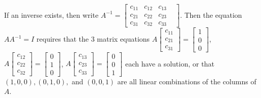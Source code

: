 \documentclass[10pt]{article}
\begin{document}
If an inverse exists, then write $A^{-1} = \begin{bmatrix}
c_{11}&c_{12}&c_{13}&\\ 
c_{21}&c_{22}&c_{23}&\\ 
c_{31}&c_{32}&c_{33}& 
\end{bmatrix} $. Then the equation $AA^{-1}=I$ requires that the 3 matrix equations
$A\begin{bmatrix} c_{11}\\ c_{21}\\c_{31}\end{bmatrix} = \begin{bmatrix} 1\\0\\0\end{bmatrix}$,
$A\begin{bmatrix} c_{12}\\ c_{22}\\c_{32}\end{bmatrix} = \begin{bmatrix} 0\\1\\0\end{bmatrix}$,
$A\begin{bmatrix} c_{13}\\ c_{23}\\c_{33}\end{bmatrix} = \begin{bmatrix} 0\\ 0\\1\end{bmatrix}$
each have a solution, or that $(1,0,0), (0,1,0),$ and  $(0,0,1)$ are all linear combinations of the columns of $A$.
\end{document}
